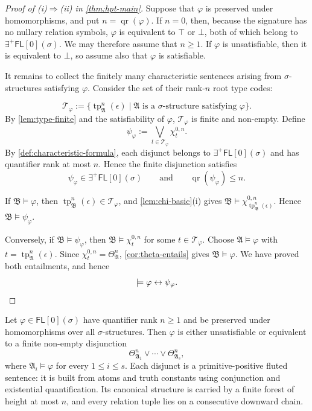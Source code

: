 \documentclass{lmcs}
\newcommand{\FL}{\mathsf{FL}}
\newcommand{\EPFL}{\exists^{+}\!\mathsf{FL}}
\newcommand{\qr}{\operatorname{qr}}
\newcommand{\tp}{\operatorname{tp}}
\newcommand{\true}{\top}
\newcommand{\false}{\bot}
\newcommand{\A}{\mathfrak{A}}
\newcommand{\B}{\mathfrak{B}}
\begin{document}
\begin{proof}[Proof of \textup{(i)}$\Rightarrow$\textup{(ii)} in
\cref{thm:hpt-main}]
Suppose that $\varphi$ is preserved under homomorphisms, and put
$n=\qr(\varphi)$.  If $n=0$, then, because the signature has no nullary
relation symbols, $\varphi$ is equivalent to $\true$ or $\false$, both of
which belong to $\EPFL[0](\sigma)$.  We may therefore assume that $n\geq1$.
If $\varphi$ is unsatisfiable, then it is equivalent to $\false$, so assume
also that $\varphi$ is satisfiable.

It remains to collect the finitely many characteristic sentences arising from
$\sigma$-structures satisfying $\varphi$.  Consider the set of their rank-$n$
root type codes:

\[
   \mathcal T_{\varphi}
   :=
   \bigl\{
      \tp_{\A}^{n}(\epsilon)
      \mid
      \A\text{ is a $\sigma$-structure satisfying }\varphi
   \bigr\}.
\]
By \cref{lem:type-finite} and the satisfiability of $\varphi$,
$\mathcal T_{\varphi}$ is finite and non-empty.  Define
\begin{equation}
   \psi_{\varphi}
   :=
   \bigvee_{t\in\mathcal T_{\varphi}}
      \chi_t^{0,n}
   .
   \label{eq:forest-normal-form}
\end{equation}
By \cref{def:characteristic-formula}, each disjunct belongs to
$\EPFL[0](\sigma)$ and has quantifier rank at most $n$.  Hence the finite
disjunction satisfies
\[
   \psi_{\varphi}\in\EPFL[0](\sigma)
   \qquad\text{and}\qquad
   \qr(\psi_{\varphi})\leq n.
\]

If $\B\models\varphi$, then
$\tp_{\B}^{n}(\epsilon)\in\mathcal T_{\varphi}$, and
\cref{lem:chi-basic}(i) gives
$\B\models\chi_{\tp_{\B}^{n}(\epsilon)}^{0,n}$.  Hence
$\B\models\psi_{\varphi}$.

Conversely, if $\B\models\psi_{\varphi}$, then
$\B\models\chi_t^{0,n}$ for some $t\in\mathcal T_{\varphi}$.  Choose
$\A\models\varphi$ with $t=\tp_{\A}^{n}(\epsilon)$.  Since
$\chi_t^{0,n}=\Theta_{\A}^{n}$, \cref{cor:theta-entails} gives
$\B\models\varphi$.  We have proved both entailments, and hence
\[
   \models\varphi\leftrightarrow\psi_{\varphi}.\qedhere
\]
\end{proof}

\begin{cor}\label{cor:forest-normal-form}
Let $\varphi\in\FL[0](\sigma)$ have quantifier rank $n\geq1$ and be
preserved under homomorphisms over all $\sigma$-structures.  Then $\varphi$
is either unsatisfiable or
equivalent to a finite non-empty disjunction
\[
   \Theta_{\A_1}^{n}\vee\cdots\vee\Theta_{\A_s}^{n},
\]
where $\A_i\models\varphi$ for every $1\leq i\leq s$.  Each disjunct is a
primitive-positive fluted sentence: it is built from atoms and truth constants
using conjunction and existential quantification.  Its canonical structure is
carried by a finite forest of height at most $n$, and every relation tuple lies
on a consecutive downward chain.
\end{cor}
\end{document}
